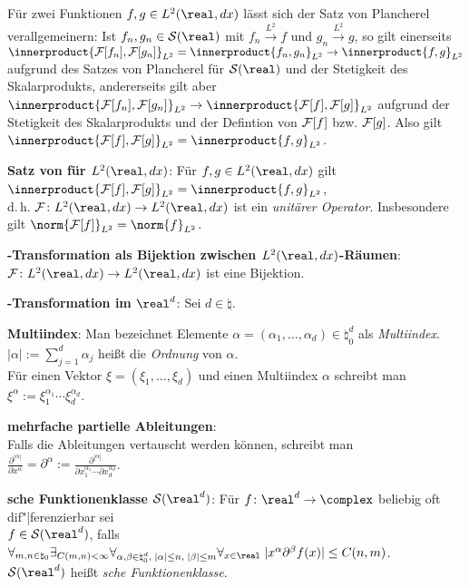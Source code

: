 \linie

Für zwei Funktionen $f, g \in L^2(\real, dx)$ lässt sich der Satz
von Plancherel verallgemeinern:
Ist $f_n, g_n \in \S(\real)$ mit $f_n \xrightarrow{L^2} f$ und
$g_n \xrightarrow{L^2} g$,
so gilt einerseits $\innerproduct{\F[f_n], \F[g_n]}_{L^2} = \innerproduct{f_n, g_n}_{L^2} \to
\innerproduct{f, g}_{L^2}$
aufgrund des Satzes von Plancherel für $\S(\real)$ und der Stetigkeit des
Skalarprodukts, andererseits gilt aber
$\innerproduct{\F[f_n], \F[g_n]}_{L^2} \to \innerproduct{\F[f], \F[g]}_{L^2}$
aufgrund der Stetigkeit des Skalarprodukts und der Defintion von $\mathcal{F}[f]$ bzw.
$\mathcal{F}[g]$.
Also gilt $\innerproduct{\F[f], \F[g]}_{L^2} = \innerproduct{f, g}_{L^2}$.

\textbf{Satz von  für $L^2(\real, dx)$}:
Für $f, g \in L^2(\real, dx)$ gilt
$\innerproduct{\F[f], \F[g]}_{L^2} = \innerproduct{f, g}_{L^2}$,\\
d.\,h. $\F\colon L^2(\real, dx) \rightarrow L^2(\real, dx)$ ist ein
\emph{unitärer Operator}.
Insbesondere gilt $\norm{\F[f]}_{L^2} = \norm{f}_{L^2}$.

\linie

\textbf{-Transformation als Bijektion zwischen
$L^2(\real, dx)$-Räumen}:\\
$\F\colon L^2(\real, dx) \rightarrow L^2(\real, dx)$ ist eine Bijektion.

\linie
\pagebreak

\textbf{-Transformation im $\real^d$}:
Sei $d \in \natural$.

\textbf{Multiindex}:
Man bezeichnet Elemente
$\alpha = (\alpha_1, \dotsc, \alpha_d) \in \natural_0^d$
als \emph{Multiindex}.\\
$|\alpha| := \sum_{j=1}^d \alpha_j$ heißt die \emph{Ordnung} von $\alpha$.\\
Für einen Vektor $\xi = (\xi_1, \dotsc, \xi_d)$ und einen Multiindex
$\alpha$ schreibt man $\xi^\alpha := \xi_1^{\alpha_1} \dotsm \xi_d^{\alpha_d}$.

\textbf{mehrfache partielle Ableitungen}:\\
Falls die Ableitungen vertauscht werden können, schreibt man
$\frac{\partial^{|\alpha|}}{\partial x^\alpha} = \partial^\alpha :=
\frac{\partial^{|\alpha|}}{\partial x_1^{\alpha_1} \dotsm
\partial x_d^{\alpha_d}}$.

\textbf{sche Funktionenklasse $\S(\real^d)$}:
Für $f \colon \real^d \rightarrow \complex$ beliebig oft dif"|ferenzierbar
sei\\
$f \in \S(\real^d)$, falls
$\forall_{m, n \in \natural_0} \exists_{C(m, n) < \infty}
\forall_{\alpha, \beta \in \natural_0^d,\; |\alpha| \le n,\; |\beta| \le m}
\forall_{x \in \real}\; |x^\alpha \partial^\beta f(x)| \le C(n, m)$.\\
$\S(\real^d)$ heißt \emph{sche Funktionenklasse}.

